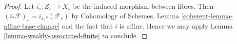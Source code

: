 \documentclass[10pt,a4paper]{amsart}
\theoremstyle{plain}
\theoremstyle{definition}
\theoremstyle{remark}
\numberwithin{equation}{subsection}
\begin{document}
\begin{proof}
Let $i_s : Z_s \to X_s$ be the induced morphism between fibres.
Then $(i_*\mathcal{F})_s = i_{s, *}(\mathcal{F}_s)$ by
Cohomology of Schemes, Lemma \ref{coherent-lemma-affine-base-change}
and the fact that $i$ is affine. Hence
we may apply Lemma \ref{lemma-weakly-associated-finite} to conclude.
\end{proof}
\end{document}
